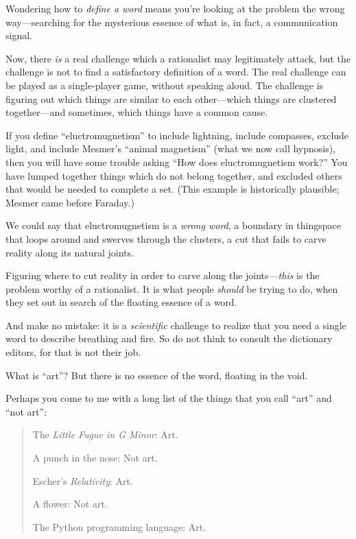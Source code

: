 { Wondering how to \textit{define a word} means
you're looking at the problem the wrong way---searching
for the mysterious essence of what is, in fact, a communication
signal.


 Now, there \textit{is} a real challenge which a rationalist may
legitimately attack, but the challenge is not to find a satisfactory
definition of a word. The real challenge can be played as a
single-player game, without speaking aloud. The challenge is figuring
out which things are similar to each other---which things are clustered
together---and sometimes, which things have a common cause.


 If you define
``eluctromugnetism'' to include
lightning, include compasses, exclude light, and include
Mesmer's ``animal
magnetism'' (what we now call hypnosis), then you
will have some trouble asking ``How does
eluctromugnetism work?'' You have lumped together
things which do not belong together, and excluded others that would be
needed to complete a set. (This example is historically plausible;
Mesmer came before Faraday.)


 We could say that eluctromugnetism is a \textit{wrong word}, a
boundary in thingspace that loops around and swerves through the
clusters, a cut that fails to carve reality along its natural joints.


 Figuring where to cut reality in order to carve along the
joints---\textit{this} is the problem worthy of a rationalist. It is
what people \textit{should} be trying to do, when they set out in
search of the floating essence of a word.


 And make no mistake: it is a \textit{scientific} challenge to
realize that you need a single word to describe breathing and fire. So
do not think to consult the dictionary editors, for that is not their
job.


 What is ``art''? But there is
no essence of the word, floating in the void.


 Perhaps you come to me with a long list of the things that you
call ``art'' and
``not art'':

\begin{quote}

 The \textit{Little Fugue in G Minor}: Art.


 A punch in the nose: Not art.


 Escher's \textit{Relativity}: Art.


 A flower: Not art.


 The Python programming language: Art.



\end{quote}}
